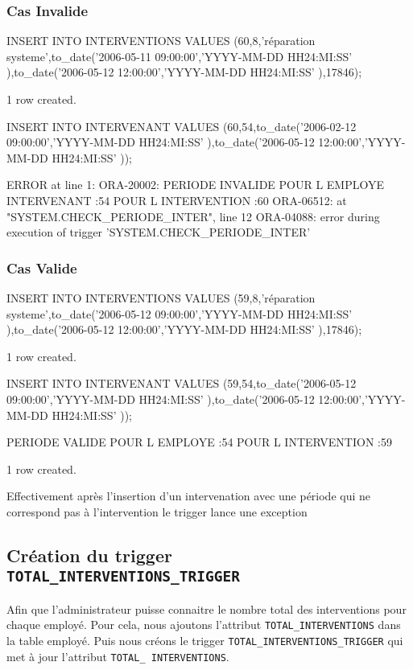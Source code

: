 \documentclass[•]{article}
\begin{document}
\subsubsection{Cas Invalide}
\begin{sql}
INSERT INTO INTERVENTIONS VALUES (60,8,'réparation systeme',to_date('2006-05-11 09:00:00','YYYY-MM-DD HH24:MI:SS' ),to_date('2006-05-12 12:00:00','YYYY-MM-DD HH24:MI:SS' ),17846);

1 row created.

INSERT INTO INTERVENANT VALUES (60,54,to_date('2006-02-12 09:00:00','YYYY-MM-DD HH24:MI:SS' ),to_date('2006-05-12 12:00:00','YYYY-MM-DD HH24:MI:SS' ));

ERROR at line 1:
ORA-20002: PERIODE INVALIDE POUR L EMPLOYE INTERVENANT :54  POUR L INTERVENTION
:60
ORA-06512: at "SYSTEM.CHECK_PERIODE_INTER", line 12
ORA-04088: error during execution of trigger 'SYSTEM.CHECK_PERIODE_INTER'
\end{sql}

\subsubsection{Cas Valide}
\begin{sql}
INSERT INTO INTERVENTIONS VALUES (59,8,'réparation systeme',to_date('2006-05-12 09:00:00','YYYY-MM-DD HH24:MI:SS' ),to_date('2006-05-12 12:00:00','YYYY-MM-DD HH24:MI:SS' ),17846);

1 row created.

INSERT INTO INTERVENANT VALUES (59,54,to_date('2006-05-12 09:00:00','YYYY-MM-DD HH24:MI:SS' ),to_date('2006-05-12 12:00:00','YYYY-MM-DD HH24:MI:SS' ));

PERIODE VALIDE POUR L EMPLOYE :54  POUR L INTERVENTION :59

1 row created.
\end{sql}

Effectivement après l'insertion d'un intervenation avec une période qui ne correspond pas à l'intervention le trigger lance une exception

\subsection{Création du trigger \texttt{TOTAL\_INTERVENTIONS\_TRIGGER}}
Afin que l'administrateur puisse connaitre le nombre total des interventions pour chaque employé. 
Pour cela, nous ajoutons l'attribut \texttt{TOTAL\_INTERVENTIONS} dans la table employé.
Puis nous créons le trigger \texttt{TOTAL\_INTERVENTIONS\_TRIGGER} qui met à jour l’attribut \texttt{TOTAL\_ INTERVENTIONS}.
\end{document}
